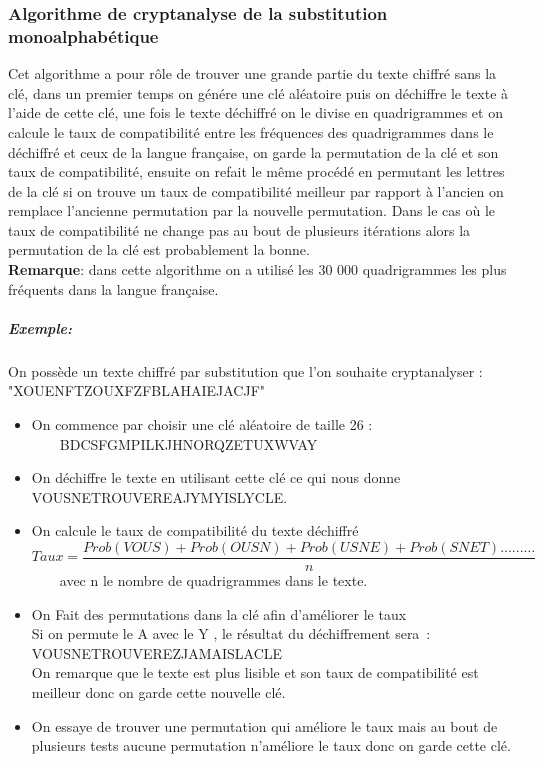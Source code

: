 \documentclass[11pt]{article}
\begin{document}
\subsubsection{Algorithme de cryptanalyse de la substitution monoalphabétique}
Cet algorithme a pour rôle de trouver une grande partie du texte chiffré sans la clé, dans un premier
temps on génére une clé aléatoire puis on déchiffre le texte à l’aide de cette clé, une fois le texte déchiffré on le divise en quadrigrammes et on calcule le taux de compatibilité entre les fréquences des quadrigrammes dans le déchiffré et ceux de la langue française, on garde la permutation de la clé et son taux de compatibilité, ensuite on refait le même procédé en permutant les lettres de la clé si on trouve un taux de compatibilité meilleur par rapport à l’ancien on remplace l’ancienne permutation par la nouvelle permutation. Dans le cas où le taux de compatibilité ne change pas au bout de plusieurs itérations alors la permutation de la clé est probablement la bonne. \\
\textbf{Remarque}: dans cette algorithme on a utilisé les 30 000 quadrigrammes les plus fréquents dans la langue française.
\subparagraph{Exemple:} 
On possède un texte chiffré par substitution que l'on souhaite cryptanalyser :\\
"XOUENFTZOUXFZFBLAHAIEJACJF" \\
\begin{itemize}[label=\textbullet]
   \item On commence par choisir une clé aléatoire de taille 26 : \\
\ \ \ \ BDCSFGMPILKJHNORQZETUXWVAY   
   \item On déchiffre le texte en utilisant cette clé ce qui nous donne \\
VOUSNETROUVEREAJYMYISLYCLE.
\item On calcule le taux de compatibilité du texte déchiffré \\
 \[ Taux = \frac{Prob(VOUS) + Prob(OUSN) + Prob(USNE) + Prob(SNET)......… }{n} \]
 \ \ \ \ avec n le nombre de quadrigrammes dans le texte.
\item On Fait des permutations dans la clé afin d'améliorer le taux \\
Si on permute le A avec le Y , le résultat du déchiffrement sera : \\
VOUSNETROUVEREZJAMAISLACLE \\
On remarque que le texte est plus lisible et son taux de compatibilité est meilleur donc on garde cette nouvelle clé. \\
\item  On essaye de trouver une permutation qui améliore le taux mais au bout de plusieurs tests aucune permutation n'améliore le taux donc on garde cette clé.
\end{itemize}
\end{document}
